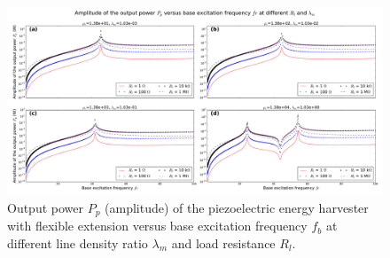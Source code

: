 \documentclass{elsarticle}
\begin{document}
\begin{figure}[!htbp]
    \centering
    \includegraphics[width=\textwidth]{./fig_output_power_vs_fr_Rl_lamm_all}
    \caption{Output power $P_p$ (amplitude) of the piezoelectric energy harvester with flexible extension versus base excitation frequency $f_b$ at different line density ratio $\lambda_m$ and load resistance $R_l$.}
    \label{fig:fig_output_power_vs_fr_Rl_lamm_all}
\end{figure}





\end{document}
